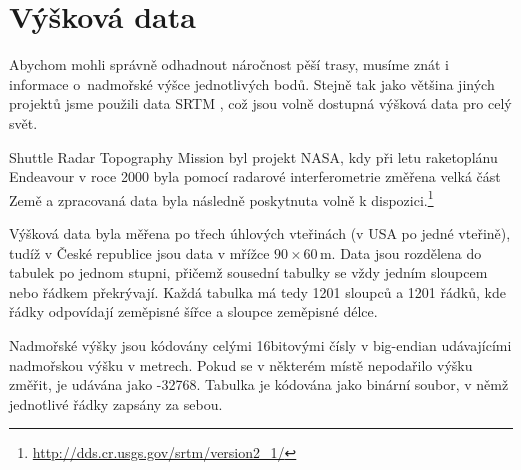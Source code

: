 \section{Výšková data}
Abychom mohli správně odhadnout náročnost pěší trasy, musíme znát i informace
o~nadmořské výšce jednotlivých bodů. Stejně tak jako většina jiných projektů jsme
použili data SRTM \cite{srtmweb}, což jsou volně dostupná výšková data pro celý
svět.

Shuttle Radar Topography Mission byl projekt NASA, kdy při letu raketoplánu
Endeavour v roce 2000 byla pomocí radarové interferometrie změřena velká část
Země a zpracovaná data byla následně poskytnuta volně k dispozici.\footnote{\url{http://dds.cr.usgs.gov/srtm/version2_1/}} 

Výšková data byla měřena po třech úhlových vteřinách (v USA po jedné vteřině),
tudíž v České republice jsou data v mřížce $90\times60$\,m. Data jsou rozdělena
do tabulek po jednom stupni, přičemž sousední tabulky se vždy jedním sloupcem
nebo řádkem překrývají. Každá tabulka má tedy 1201 sloupců a 1201 řádků, kde
řádky odpovídají zeměpisné šířce a sloupce zeměpisné délce.

Nadmořské výšky jsou kódovány celými 16bitovými čísly v big-endian udávajícími
nadmořskou výšku v metrech. Pokud se v některém místě nepodařilo výšku změřit,
je udávána jako -32768. Tabulka je kódována jako binární soubor, v němž
jednotlivé řádky zapsány za sebou.
